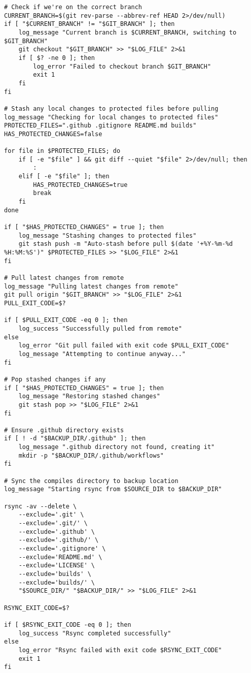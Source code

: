\begin{verbatim}
# Check if we're on the correct branch
CURRENT_BRANCH=$(git rev-parse --abbrev-ref HEAD 2>/dev/null)
if [ "$CURRENT_BRANCH" != "$GIT_BRANCH" ]; then
    log_message "Current branch is $CURRENT_BRANCH, switching to $GIT_BRANCH"
    git checkout "$GIT_BRANCH" >> "$LOG_FILE" 2>&1
    if [ $? -ne 0 ]; then
        log_error "Failed to checkout branch $GIT_BRANCH"
        exit 1
    fi
fi

# Stash any local changes to protected files before pulling
log_message "Checking for local changes to protected files"
PROTECTED_FILES=".github .gitignore README.md builds"
HAS_PROTECTED_CHANGES=false

for file in $PROTECTED_FILES; do
    if [ -e "$file" ] && git diff --quiet "$file" 2>/dev/null; then
        :
    elif [ -e "$file" ]; then
        HAS_PROTECTED_CHANGES=true
        break
    fi
done

if [ "$HAS_PROTECTED_CHANGES" = true ]; then
    log_message "Stashing changes to protected files"
    git stash push -m "Auto-stash before pull $(date '+%Y-%m-%d %H:%M:%S')" $PROTECTED_FILES >> "$LOG_FILE" 2>&1
fi

# Pull latest changes from remote
log_message "Pulling latest changes from remote"
git pull origin "$GIT_BRANCH" >> "$LOG_FILE" 2>&1
PULL_EXIT_CODE=$?

if [ $PULL_EXIT_CODE -eq 0 ]; then
    log_success "Successfully pulled from remote"
else
    log_error "Git pull failed with exit code $PULL_EXIT_CODE"
    log_message "Attempting to continue anyway..."
fi

# Pop stashed changes if any
if [ "$HAS_PROTECTED_CHANGES" = true ]; then
    log_message "Restoring stashed changes"
    git stash pop >> "$LOG_FILE" 2>&1
fi

# Ensure .github directory exists
if [ ! -d "$BACKUP_DIR/.github" ]; then
    log_message ".github directory not found, creating it"
    mkdir -p "$BACKUP_DIR/.github/workflows"
fi

# Sync the compiles directory to backup location
log_message "Starting rsync from $SOURCE_DIR to $BACKUP_DIR"

rsync -av --delete \
    --exclude='.git' \
    --exclude='.git/' \
    --exclude='.github' \
    --exclude='.github/' \
    --exclude='.gitignore' \
    --exclude='README.md' \
    --exclude='LICENSE' \
    --exclude='builds' \
    --exclude='builds/' \
    "$SOURCE_DIR/" "$BACKUP_DIR/" >> "$LOG_FILE" 2>&1

RSYNC_EXIT_CODE=$?

if [ $RSYNC_EXIT_CODE -eq 0 ]; then
    log_success "Rsync completed successfully"
else
    log_error "Rsync failed with exit code $RSYNC_EXIT_CODE"
    exit 1
fi


\end{verbatim}
